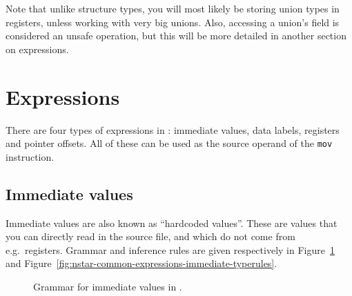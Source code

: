 Note that unlike structure types, you will most likely be storing union types in registers, unless working with very big unions.
Also, accessing a union's field is considered an unsafe operation, but this will be more detailed in another section on expressions.

\section{Expressions}\label{sec:nstar-common-expressions}

There are four types of expressions in \nstar: immediate values, data labels, registers and pointer offsets.
All of these can be used as the source operand of the \texttt{mov} instruction.

\subsection{Immediate values}\label{subsec:nstar-common-expressions-immediate}

Immediate values are also known as ``hardcoded values''.
These are values that you can directly read in the source file, and which do not come from e.g.\ registers.
Grammar and inference rules are given respectively in Figure~\ref{fig:nstar-common-expressions-immediate-grammar} and Figure~\ref{fig:nstar-common-expressions-immediate-typerules}.

\begin{figure}[H]
  \centering


  \caption{Grammar for immediate values in \nstar.}
  \label{fig:nstar-common-expressions-immediate-grammar}
\end{figure}

